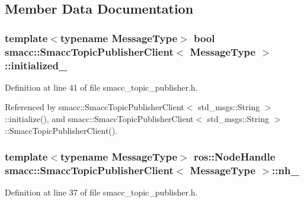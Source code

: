 \subsection{Member Data Documentation}
\subsubsection[{\texorpdfstring{initialized\+\_\+}{initialized_}}]{\setlength{\rightskip}{0pt plus 5cm}template$<$typename Message\+Type$>$ {\bf bool} {\bf smacc\+::\+Smacc\+Topic\+Publisher\+Client}$<$ Message\+Type $>$\+::initialized\+\_\+\hspace{0.3cm}{\ttfamily [private]}}\hypertarget{classsmacc_1_1SmaccTopicPublisherClient_a465e849ea4e7b61084495a1044692bf2}{}\label{classsmacc_1_1SmaccTopicPublisherClient_a465e849ea4e7b61084495a1044692bf2}


Definition at line 41 of file smacc\+\_\+topic\+\_\+publisher.\+h.



Referenced by smacc\+::\+Smacc\+Topic\+Publisher\+Client$<$ std\+\_\+msgs\+::\+String $>$\+::initialize(), and smacc\+::\+Smacc\+Topic\+Publisher\+Client$<$ std\+\_\+msgs\+::\+String $>$\+::\+Smacc\+Topic\+Publisher\+Client().

\subsubsection[{\texorpdfstring{nh\+\_\+}{nh_}}]{\setlength{\rightskip}{0pt plus 5cm}template$<$typename Message\+Type$>$ ros\+::\+Node\+Handle {\bf smacc\+::\+Smacc\+Topic\+Publisher\+Client}$<$ Message\+Type $>$\+::nh\+\_\+\hspace{0.3cm}{\ttfamily [protected]}}\hypertarget{classsmacc_1_1SmaccTopicPublisherClient_a2b238fd801e0a088ee4a7da76fef1e70}{}\label{classsmacc_1_1SmaccTopicPublisherClient_a2b238fd801e0a088ee4a7da76fef1e70}


Definition at line 37 of file smacc\+\_\+topic\+\_\+publisher.\+h.



